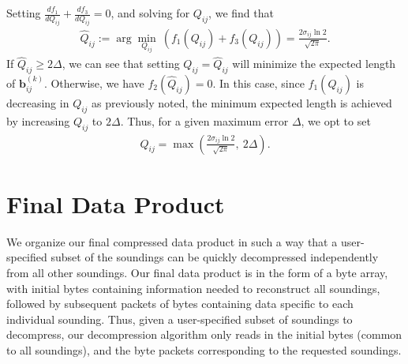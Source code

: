 \documentclass{article}
\begin{document}
Setting $\frac{d f_1}{d Q_{ij}} + \frac{d f_3}{d Q_{ij}} = 0$, and solving for $Q_{ij}$, we find that 
\begin{align} 
\hat{Q}_{ij} := \arg\min_{Q_{ij}} ~ \left( f_1(Q_{ij}) + f_3(Q_{ij}) \right) = \frac{2 \sigma_{ij} \ln 2}{\sqrt{2 \pi}}.  
\end{align} 
If $\hat{Q}_{ij} \ge 2 \Delta$, we can see that setting $Q_{ij} = \hat{Q}_{ij}$ will minimize the expected length of $\mathbf{b}^{(k)}_{ij}$. Otherwise, we have $f_2(\hat{Q}_{ij}) = 0$. In this case, since $f_1(Q_{ij})$ is decreasing in $Q_{ij}$ as previously noted, the minimum expected length is achieved by increasing $Q_{ij}$ to $2 \Delta$. Thus, for a given maximum error $\Delta$, we opt to set 
\begin{align} 
Q_{ij} = \max \left( \frac{2 \sigma_{ij} \ln 2}{\sqrt{2 \pi}}, ~ 2 \Delta \right). 
\end{align} 

\section{Final Data Product} 
\label{sec:dataproduct} 
We organize our final compressed data product in such a way that a user-specified subset of the soundings can be quickly decompressed independently from all other soundings. Our final data product is in the form of a byte array, with initial bytes containing information needed to reconstruct all soundings, followed by subsequent packets of bytes containing data specific to each individual sounding. Thus, given a user-specified subset of soundings to decompress, our decompression algorithm only reads in the initial bytes (common to all soundings), and the byte packets corresponding to the requested soundings. 
\end{document}
